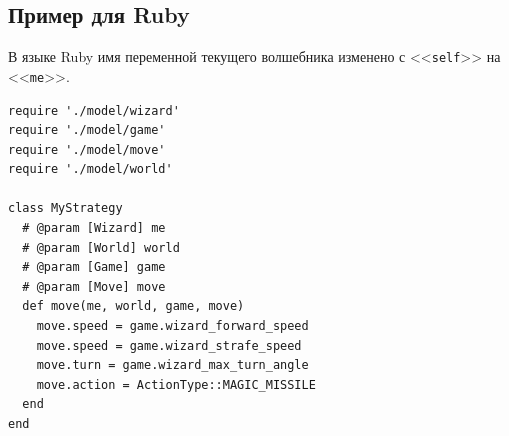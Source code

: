 \newpage
\subsection{Пример для Ruby}

В языке Ruby имя переменной текущего волшебника изменено с <<\texttt{self}>> на <<\texttt{me}>>.

\begin{verbatim}
require './model/wizard'
require './model/game'
require './model/move'
require './model/world'

class MyStrategy
  # @param [Wizard] me
  # @param [World] world
  # @param [Game] game
  # @param [Move] move
  def move(me, world, game, move)
    move.speed = game.wizard_forward_speed
    move.speed = game.wizard_strafe_speed
    move.turn = game.wizard_max_turn_angle
    move.action = ActionType::MAGIC_MISSILE
  end
end
\end{verbatim}
